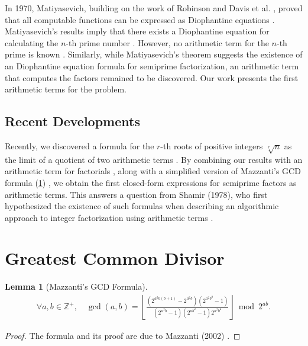 \documentclass{article}
\theoremstyle{plain}
\newtheorem{lemma}[theorem]{Lemma}
\theoremstyle{definition}
\newcommand{\floor}[1]{\left\lfloor #1 \right\rfloor}
\newcommand{\Z}{\mathbb{Z}}
\begin{document}
In 1970, Matiyasevich, building on the work of Robinson \cite{robinson1952arithmetic} and Davis et al. \cite{davis1961diophantine}, proved that all computable functions can be expressed as Diophantine equations \cite{matiyasevich1980diophantine}. Matiyasevich's results imply that there exists a Diophantine equation for calculating the $n$-th prime number \cite{matiyasevich1993hilbert}. However, no arithmetic term for the $n$-th prime is known \cite{prunescu2024factorial}. Similarly, while Matiyasevich's theorem suggests the existence of an Diophantine equation formula for semiprime factorization, an arithmetic term that computes the factors remained to be discovered. Our work presents the first arithmetic terms for the problem.

\subsection{Recent Developments}
Recently, we discovered a formula for the $r$-th roots of positive integers $\sqrt[r]{n}$ as the limit of a quotient of two arithmetic terms \cite{shunia2024polynomial}. By combining our results with an arithmetic term for factorials \cite{robinson1952arithmetic, prunescu2024factorial}, along with a simplified version of Mazzanti's GCD formula (\cref{proof:mazzantigcd}) \cite{mazzanti2002plainbases}, we obtain the first closed-form expressions for semiprime factors as arithmetic terms. This answers a question from Shamir (1978), who first hypothesized the existence of such formulas when describing an algorithmic approach to integer factorization using arithmetic terms \cite{shamir1978factoring}.

\section{Greatest Common Divisor} \label{section:gcd}

\begin{lemma}[Mazzanti's GCD Formula] \label{proof:mazzantigcd}
\begin{align*}
\forall a,b \in \Z^+, \quad
\gcd(a,b) = \floor{\frac{(2^{a^2 b(b+1)} - 2^{a^2 b}) (2^{a^2 b^2} - 1)}
         {(2^{a^2 b} - 1)(2^{ab^2}-1)2^{a^2 b^2}}} \bmod 2^{ab}.
\end{align*}
\end{lemma}
\begin{proof}
The formula and its proof are due to Mazzanti (2002) \cite{mazzanti2002plainbases}.
\end{proof}
\end{document}
